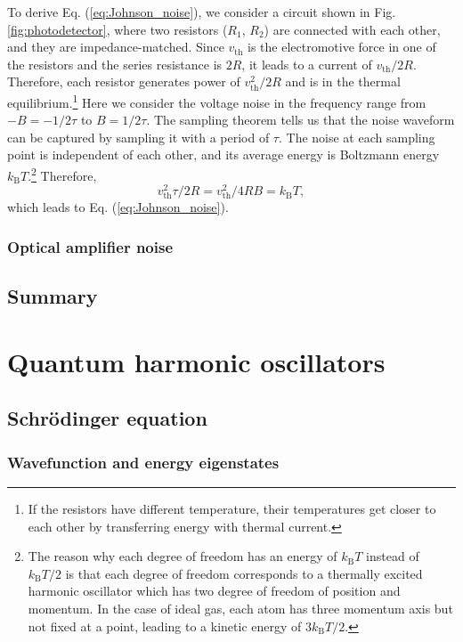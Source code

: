 \documentclass{book}
\begin{document}
To derive Eq. (\ref{eq:Johnson_noise}), we consider a circuit shown in Fig. \ref{fig:photodetector}, where two resistors ($R_1$, $R_2$) are connected with each other, and they are impedance-matched.\cite{nyquist1928} Since $v_\mathrm{th}$ is the electromotive force in one of the resistors and the series resistance is $2R$, it leads to a current of $v_\mathrm{th}/2R$. Therefore, each resistor generates power of $v_\mathrm{th}^2/2R$ and is in the thermal equilibrium.\footnote{If the resistors have different temperature, their temperatures get closer to each other by transferring energy with thermal current.} Here we consider the voltage noise in the frequency range from $-B = -1/2\tau$ to $B = 1/2\tau$. The sampling theorem tells us that the noise waveform can be captured by sampling it with a period of $\tau$. The noise at each sampling point is independent of each other, and its average energy is Boltzmann energy $k_\mathrm BT$.\footnote{The reason why each degree of freedom has an energy of $k_\mathrm B T$ instead of $k_\mathrm B T/2$ is that each degree of freedom corresponds to a thermally excited harmonic oscillator which has two degree of freedom of position and momentum. In the case of ideal gas, each atom has three momentum axis but not fixed at a point, leading to a kinetic energy of $3k_\mathrm B T / 2$.} Therefore,
\begin{equation}
v_\mathrm{th}^2\tau/2R = v_\mathrm{th}^2 / 4RB = k_\mathrm{B}T,
\end{equation}
which leads to Eq. (\ref{eq:Johnson_noise}).

\subsection{Optical amplifier noise}
\section{Summary}

\chapter{Quantum harmonic oscillators}
\section{Schr\"odinger equation}
\subsection{Wavefunction and energy eigenstates}
\end{document}
